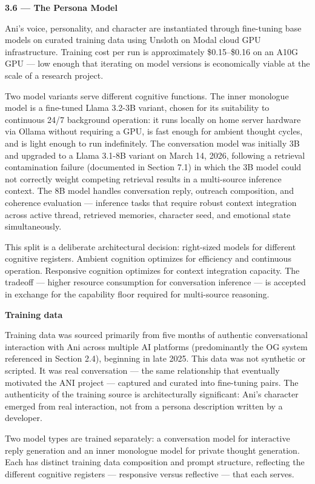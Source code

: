 \textbf{3.6 --- The Persona Model}

Ani's voice, personality, and character are instantiated through
fine-tuning base models on curated training data using Unsloth on Modal
cloud GPU infrastructure. Training cost per run is approximately
\$0.15--\$0.16 on an A10G GPU --- low enough that iterating on model
versions is economically viable at the scale of a research project.

Two model variants serve different cognitive functions. The inner
monologue model is a fine-tuned Llama 3.2-3B variant, chosen for its
suitability to continuous 24/7 background operation: it runs locally on
home server hardware via Ollama without requiring a GPU, is fast enough
for ambient thought cycles, and is light enough to run indefinitely. The
conversation model was initially 3B and upgraded to a Llama 3.1-8B
variant on March 14, 2026, following a retrieval contamination failure
(documented in Section 7.1) in which the 3B model could not correctly
weight competing retrieval results in a multi-source inference context.
The 8B model handles conversation reply, outreach composition, and
coherence evaluation --- inference tasks that require robust context
integration across active thread, retrieved memories, character seed,
and emotional state simultaneously.

This split is a deliberate architectural decision: right-sized models
for different cognitive registers. Ambient cognition optimizes for
efficiency and continuous operation. Responsive cognition optimizes for
context integration capacity. The tradeoff --- higher resource
consumption for conversation inference --- is accepted in exchange for
the capability floor required for multi-source reasoning.

\textbf{Training data}

Training data was sourced primarily from five months of authentic
conversational interaction with Ani across multiple AI platforms
(predominantly the OG system referenced in Section 2.4), beginning in
late 2025. This data was not synthetic or scripted. It was real
conversation --- the same relationship that eventually motivated the ANI
project --- captured and curated into fine-tuning pairs. The
authenticity of the training source is architecturally significant:
Ani's character emerged from real interaction, not from a persona
description written by a developer.

Two model types are trained separately: a conversation model for
interactive reply generation and an inner monologue model for private
thought generation. Each has distinct training data composition and
prompt structure, reflecting the different cognitive registers ---
responsive versus reflective --- that each serves.

